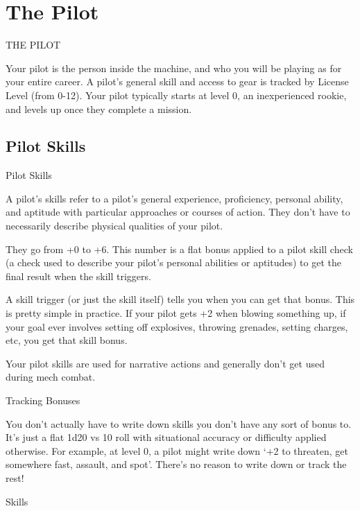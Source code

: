 \section{The Pilot}
  THE PILOT   

Your pilot is the person inside the machine, and who you will be playing as for your entire career.  
A pilot’s general skill and access to gear is tracked by License Level (from 0-12). Your pilot  
typically starts at level 0, an inexperienced rookie, and levels up once they complete a  
mission.  

                                                                                                         
\subsection{Pilot Skills}

                                                   Pilot Skills  

A pilot’s skills refer to a pilot’s general experience, proficiency, personal ability, and aptitude with  
particular approaches or courses of action. They don’t have to necessarily describe physical  
qualities of your pilot.  

They go from +0 to +6. This number is a flat bonus applied to a pilot skill check (a check used to  
describe your pilot’s personal abilities or aptitudes) to get the final result when the skill triggers.  

A skill trigger (or just the skill itself) tells you when you can get that bonus. This is pretty simple in  
practice. If your pilot gets +2 when blowing something up, if your goal ever involves setting off  
explosives, throwing grenades, setting charges, etc, you get that skill bonus.   

Your pilot skills are used for narrative actions and generally don’t get used during mech combat.  

                                                Tracking Bonuses
 

You don’t actually have to write down skills you don’t have any sort of bonus to. It’s just a flat  
1d20 vs 10 roll with situational accuracy or difficulty applied otherwise. For example, at level 0, a  
pilot might write down ‘+2 to threaten, get somewhere fast, assault, and spot’. There’s no reason  
to write down or track the rest!
 

                                                        Skills  

